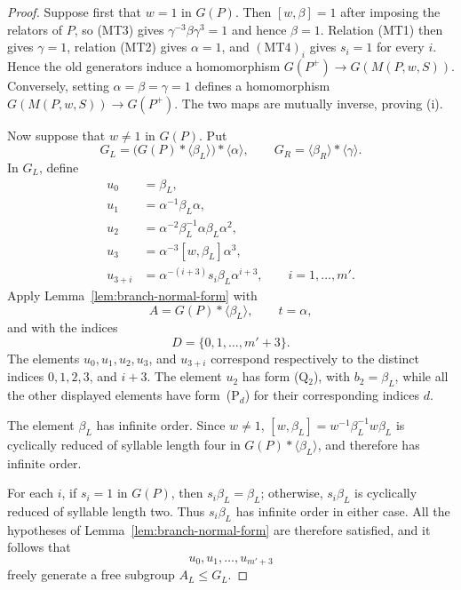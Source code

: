 \documentclass[10pt,a4paper]{amsart}
\begin{document}
	\begin{proof}
		Suppose first that $w=1$ in $G(P)$. Then
		$[w,\beta]=1$ after imposing the relators of $P$, so (MT3) gives
		$\gamma^{-3}\beta\gamma^3=1$ and hence $\beta=1$. Relation (MT1)
		then gives $\gamma=1$, relation (MT2) gives $\alpha=1$, and
		$(\mathrm{MT4})_i$ gives $s_i=1$ for every $i$. Hence the old
		generators induce a homomorphism $G(P^+)\to G(M(P,w,S))$. Conversely,
		setting $\alpha=\beta=\gamma=1$ defines a homomorphism
		$G(M(P,w,S))\to G(P^+)$. The two maps are mutually inverse, proving (i).
		
		Now suppose that $w\ne1$ in $G(P)$. Put
		\[
		G_L=\bigl(G(P)*\langle\beta_L\rangle\bigr)*\langle\alpha\rangle,
		\qquad
		G_R=\langle\beta_R\rangle*\langle\gamma\rangle .
		\]
		In $G_L$, define
		\[
		\begin{aligned}
			u_0&=\beta_L,\\
			u_1&=\alpha^{-1}\beta_L\alpha,\\
			u_2&=\alpha^{-2}\beta_L^{-1}\alpha\beta_L\alpha^2,\\
			u_3&=\alpha^{-3}[w,\beta_L]\alpha^3,\\
			u_{3+i}&=\alpha^{-(i+3)}s_i\beta_L\alpha^{i+3},
			\qquad i=1,\dots,m'.
		\end{aligned}
		\]
		Apply Lemma~\ref{lem:branch-normal-form} with
		\[
		A=G(P)*\langle\beta_L\rangle,\qquad t=\alpha,
		\]
		and with the indices
		\[
		D=\{0,1,\ldots,m'+3\}.
		\]
		The elements $u_0,u_1,u_2,u_3$, and $u_{3+i}$ correspond respectively to the distinct indices $0,1,2,3$, and $i+3$. The element $u_2$ has form (Q$_2$), with $b_2=\beta_L$, while all the other displayed elements have form~(P$_d$) for their corresponding indices $d$.
		
		The element $\beta_L$ has infinite order. Since $w\ne1$, $[w,\beta_L]=w^{-1}\beta_L^{-1}w\beta_L$
		is cyclically reduced of syllable length four in
		$G(P)*\langle\beta_L\rangle$,
		and therefore has infinite order. 
		
		For each $i$, if $s_i=1$ in $G(P)$, then $s_i\beta_L=\beta_L$; otherwise, $s_i\beta_L$ is cyclically reduced of syllable length two. Thus $s_i\beta_L$ has infinite order in either case. All the hypotheses of Lemma~\ref{lem:branch-normal-form} are therefore satisfied, and it follows that
		\[
		u_0,u_1,\ldots,u_{m'+3}
		\]
		freely generate a free subgroup $A_L\le G_L$.
		

\end{proof}
\end{document}
